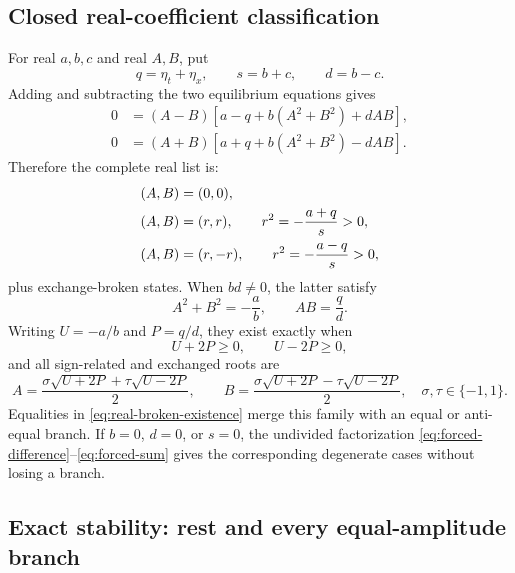\subsection{Closed real-coefficient classification}

For real $a,b,c$ and real $A,B$, put
\begin{equation}
 q=\eta_t+\eta_x,\qquad s=b+c,\qquad d=b-c.
 \label{eq:forcing-combinations}
\end{equation}
Adding and subtracting the two equilibrium equations gives
\begin{align}
 0&=(A-B)\left[a-q+b(A^2+B^2)+dAB\right],
 \label{eq:forced-difference}\\
 0&=(A+B)\left[a+q+b(A^2+B^2)-dAB\right].
 \label{eq:forced-sum}
\end{align}
Therefore the complete real list is:
\begin{align}
 &(A,B)=(0,0),\notag\\
 &(A,B)=(r,r),\qquad r^2=-\frac{a+q}{s}>0,
 \label{eq:real-in-phase}\\
 &(A,B)=(r,-r),\qquad r^2=-\frac{a-q}{s}>0,
 \label{eq:real-antiphase}
\end{align}
plus exchange-broken states. When $bd\ne0$, the latter satisfy
\begin{equation}
 A^2+B^2=-\frac{a}{b},\qquad AB=\frac{q}{d}.
 \label{eq:real-broken-invariants}
\end{equation}
Writing $U=-a/b$ and $P=q/d$, they exist exactly when
\begin{equation}
 U+2P\geq0,\qquad U-2P\geq0,
 \label{eq:real-broken-existence}
\end{equation}
and all sign-related and exchanged roots are
\begin{equation}
 A=\frac{\sigma\sqrt{U+2P}+\tau\sqrt{U-2P}}{2},\qquad
 B=\frac{\sigma\sqrt{U+2P}-\tau\sqrt{U-2P}}{2},
 \quad \sigma,\tau\in\{-1,1\}.
 \label{eq:real-broken-roots}
\end{equation}
Equalities in \eqref{eq:real-broken-existence} merge this family with an
equal or anti-equal branch. If $b=0$, $d=0$, or $s=0$, the undivided
factorization \eqref{eq:forced-difference}--\eqref{eq:forced-sum} gives the
corresponding degenerate cases without losing a branch.

\subsection{Exact stability: rest and every equal-amplitude branch}


